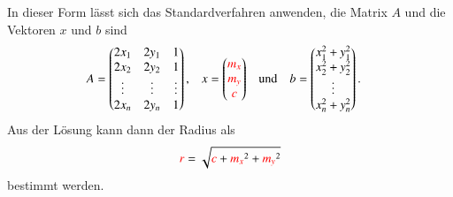 In dieser Form lässt sich das Standardverfahren anwenden, die Matrix
$A$ und die Vektoren $x$ und $b$ sind
\begin{align*}
A
&=
\begin{pmatrix}
2x_1  & 2y_1 & 1    \\
2x_2  & 2y_2 & 1    \\
\vdots&\vdots&\vdots\\
2x_n  & 2y_n & 1    \\
\end{pmatrix},
&
x&=\begin{pmatrix}
{\color{red}m_x}\\
{\color{red}m_y}\\
{\color{red}c}
\end{pmatrix}
&&\text{und}&
b
&=
\begin{pmatrix}
x_1^2+y_1^2\\
x_2^2+y_2^2\\
\vdots\\
x_n^2+y_n^2
\end{pmatrix}.
\end{align*}
Aus der Lösung kann dann der Radius als 
\[
{\color{red}r}= 
\sqrt{
{\color{red}c}
+
{\color{red}m_x}^2
+
{\color{red}m_y}^2
}
\]
bestimmt werden.

